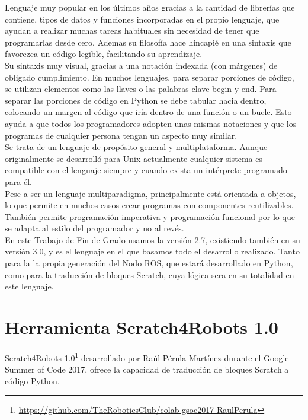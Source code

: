 Lenguaje muy popular en los últimos años gracias a la cantidad de librerías que contiene, tipos de datos y funciones incorporadas en el propio lenguaje, que ayudan a realizar muchas tareas habituales sin necesidad de tener que programarlas desde cero. Ademas su filosofía hace hincapié en una sintaxis que favorezca un código legible, facilitando su aprendizaje.\\

Su sintaxis muy visual, gracias a una notación indexada (con márgenes) de obligado cumplimiento. En muchos lenguajes, para separar porciones de código, se utilizan elementos como las llaves o las palabras clave begin y end. Para separar las porciones de código en Python se debe tabular hacia dentro, colocando un margen al código que iría dentro de una función o un bucle. Esto ayuda a que todos los programadores adopten unas mismas notaciones y que los programas de cualquier persona tengan un aspecto muy similar.\\

Se trata de un lenguaje de propósito general y multiplataforma. Aunque originalmente se desarrolló para Unix actualmente cualquier sistema es compatible con el lenguaje siempre y cuando exista un intérprete programado para él.\\

Pese a ser un lenguaje multiparadigma, principalmente está orientada a objetos, lo que permite en muchos casos crear programas con componentes reutilizables. También permite programación imperativa y programación funcional por lo que se adapta al estilo del programador y no al revés.\\

En este Trabajo de Fin de Grado usamos la versión 2.7, existiendo también en su versión 3.0, y es el lenguaje en el que basamos todo el desarrollo realizado. Tanto para la  la propia generación del Nodo ROS, que estará desarrollado en Python, como para la traducción de bloques Scratch, cuya lógica sera en su totalidad en este lenguaje.\\

\section{Herramienta Scratch4Robots 1.0}
Scratch4Robots 1.0\footnote{\url{https://github.com/TheRoboticsClub/colab-gsoc2017-RaulPerula}} desarrollado por Raúl Pérula-Martínez durante el Google Summer of Code 2017, ofrece la capacidad de traducción de bloques Scratch a código Python.\\

